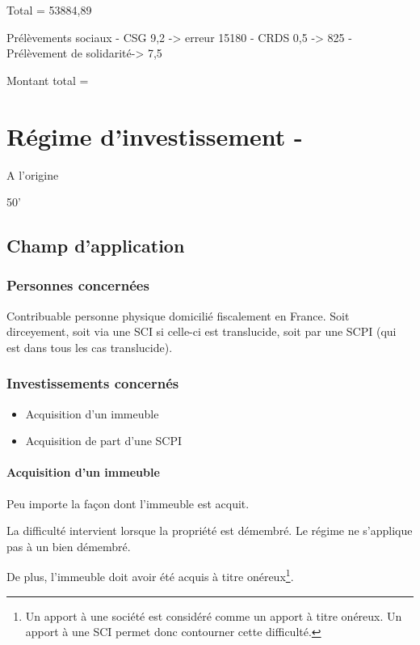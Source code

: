 Total = 53884,89

Prélèvements sociaux
- CSG									9,2 ->  erreur 15180
- CRDS								0,5 ->  825
- Prélèvement de solidarité-> 7,5%

Montant total = 




\section{Régime d’investissement  - }

	A l'origine

	50' \articleDu{}{\cgi}

	\subsection{Champ d’application}


		\subsubsection{Personnes concernées}

			Contribuable personne physique domicilié fiscalement en France. Soit dirceyement, soit via une SCI si celle-ci est translucide, soit par une SCPI (qui est dans tous les cas translucide).

		\subsubsection{Investissements concernés}

			\begin{itemize}
				\item Acquisition d'un immeuble
				\item Acquisition de part d'une SCPI
			\end{itemize}

			\paragraph{Acquisition d'un immeuble}

				Peu importe la façon dont l'immeuble est acquit.

				La difficulté intervient lorsque la propriété est démembré. Le régime \Duflot ne s'applique pas à un bien démembré.

				De plus, l'immeuble doit avoir été acquis à titre onéreux\footnote{Un apport à une société est considéré comme un apport à titre onéreux. Un apport à une SCI permet donc contourner cette difficulté.}.

